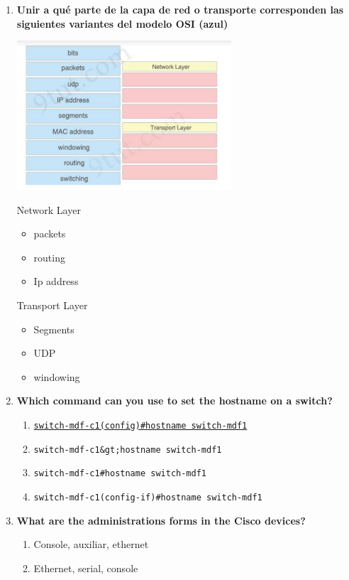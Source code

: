 \documentclass{article}
\begin{document}
\begin{enumerate}[label=\textbf{\arabic*.}]
  \item \textbf{Unir a qué parte de la capa de red o transporte corresponden 
  las siguientes variantes del modelo OSI (azul)}
  \begin{center}
    \includegraphics[width=8cm]{ta02_preg01}  
  \end{center}
  Network Layer
  \begin{itemize}
    \item packets
    \item routing
    \item Ip address
  \end{itemize}
  Transport Layer
  \begin{itemize}
    \item Segments
    \item UDP
    \item windowing
  \end{itemize}
  \item \textbf{Which command can you use to set the hostname on a switch?}
  \begin{enumerate}[label=\textbf{\Alph*.}]
    \item \underline{\texttt{switch-mdf-c1(config)\#hostname switch-mdf1}}
    \item \texttt{switch-mdf-c1\&gt;hostname switch-mdf1}
    \item \texttt{switch-mdf-c1\#hostname switch-mdf1}
    \item \texttt{switch-mdf-c1(config-if)\#hostname switch-mdf1}
  \end{enumerate}
  \item \textbf{What are the administrations forms in the Cisco devices?}
    \begin{enumerate}[label=\textbf{\Alph*.}]
      \item Console, auxiliar, ethernet
      \item Ethernet, serial, console

\end{enumerate}
\end{enumerate}
\end{document}
